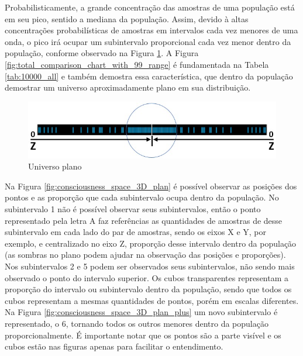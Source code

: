 Probabilisticamente, a grande concentração das amostras de uma população está em seu pico, sentido a mediana da população. Assim, devido à altas concentrações probabilísticas de amostras em intervalos cada vez menores de uma onda, o pico irá ocupar um subintervalo proporcional cada vez menor dentro da população, conforme observado na Figura \ref{fig:consciousness_flat_universe}. A Figura \ref{fig:total_comparison_chart_with_99_range} é fundamentada na Tabela \ref{tab:10000_all} e também demostra essa característica, que dentro da população demostrar um universo aproximadamente plano em sua distribuição.  
	\begin{figure}[H]
	\caption{Universo plano}
	\label{fig:consciousness_flat_universe}
	\centering
	\includegraphics[scale=.6]{sections/images/consciousness_flat_universe.jpg}
	\end{figure}

Na Figura \ref{fig:consciousness_space_3D_plan} é possível observar as posições dos pontos e as proporção que cada subintervalo ocupa dentro da população. No subintervalo 1 não é possível observar seus subintervalos, então o ponto representado pela letra A faz referências as quantidades de amostras de desse subintervalo em cada lado do par de amostras, sendo os eixos X e Y, por exemplo, e centralizado no eixo Z, proporção desse intervalo dentro da população (as sombras no plano podem ajudar na observação das posições e proporções). Nos subintervalos 2 e 5 podem ser observados seus subintervalos, não sendo mais observado o ponto do intervalo superior. Os cubos transparentes representam a proporção do intervalo ou subintervalo dentro da população, sendo que todos os cubos representam a mesmas quantidades de pontos, porém em escalas diferentes. Na Figura \ref{fig:consciousness_space_3D_plan_plus} um novo subintervalo é representado, o 6, tornando todos os outros menores dentro da população proporcionalmente. É importante notar que os pontos são a parte visível e os cubos estão nas figuras apenas para facilitar o entendimento. 

